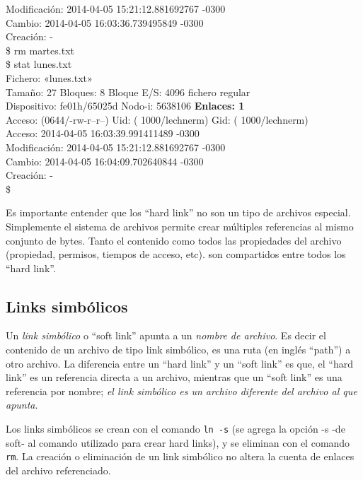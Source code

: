 \documentclass[12pt]{article}
\begin{document}
{{{Modificación: 2014-04-05 15:21:12.881692767 -0300 \\
      Cambio: 2014-04-05 16:03:36.739495849 -0300 \\
    Creación: - \\
\$ rm martes.txt  \\
\$ stat lunes.txt  \\
  Fichero: «lunes.txt» \\
  Tamaño: 27        	Bloques: 8          Bloque E/S: 4096   fichero regular \\
Dispositivo: fe01h/65025d	Nodo-i: 5638106     \textbf{Enlaces: 1} \\
Acceso: (0644/-rw-r--r--)  Uid: ( 1000/lechnerm)   Gid: ( 1000/lechnerm) \\
      Acceso: 2014-04-05 16:03:39.991411489 -0300 \\
Modificación: 2014-04-05 15:21:12.881692767 -0300 \\
      Cambio: 2014-04-05 16:04:09.702640844 -0300 \\
    Creación: - \\
\$  \\
}
\vspace*{0.4cm} } }

Es importante entender que los ``hard link'' no son un tipo de archivos especial. 
Simplemente el sistema de archivos permite crear múltiples referencias al 
mismo conjunto de bytes. Tanto el contenido como todos las propiedades del archivo
(propiedad, permisos, tiempos de acceso, etc). son compartidos entre todos los 
``hard link''.  

\subsection*{Links simbólicos}
Un \textit{link simbólico} o ``soft link'' apunta a un \textit{nombre de archivo}.
Es decir el contenido de un archivo de tipo link simbólico, es una ruta 
(en inglés ``path'') a otro archivo. La diferencia entre un ``hard link'' y un 
``soft link'' es que, el ``hard link'' es un referencia directa a un archivo, 
mientras que un ``soft link'' es una referencia por nombre; \textit{el link simbólico
es un archivo diferente del archivo al que apunta}.  


Los links simbólicos se crean con el comando \texttt{ln -s} (se agrega la opción -s
-de soft- al comando utilizado para crear hard links), y se eliminan con el comando 
\texttt{rm}. La creación o eliminación de un link simbólico no altera la cuenta de 
enlaces del archivo referenciado. 
\end{document}
